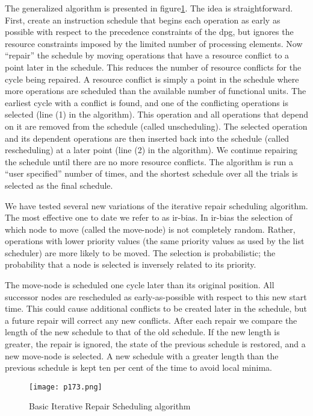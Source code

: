 The generalized algorithm is presented in figure\ref{fig:p173}. The idea is straightforward. First, create an instruction
schedule that begins each operation as early as possible with respect to the precedence constraints of the dpg,
but ignores the resource constraints imposed by the limited number of processing elements. Now “repair” the
schedule by moving operations that have a resource conflict to a point later in the schedule. This reduces the
number of resource conflicts for the cycle being repaired. A resource conflict is simply a point in the schedule
where more operations are scheduled than the available number of functional units. The earliest cycle with a
conflict is found, and one of the conflicting operations is selected (line (1) in the algorithm). This operation
and all operations that depend on it are removed from the schedule (called unscheduling). The selected
operation and its dependent operations are then inserted back into the schedule (called rescheduling) at a
later point (line (2) in the algorithm). We continue repairing the schedule until there are no more resource
conflicts. The algorithm is run a “user specified” number of times, and the shortest schedule over all the
trials is selected as the final schedule.

We have tested several new variations of the iterative repair scheduling algorithm. The most effective
one to date we refer to as ir-bias. In ir-bias the selection of which node to move (called the move-node) is
not completely random. Rather, operations with lower priority values (the same priority values as used by
the list scheduler) are more likely to be moved. The selection is probabilistic; the probability that a node is
selected is inversely related to its priority.

The move-node is scheduled one cycle later than its original position. All successor nodes are rescheduled
as early-as-possible with respect to this new start time. This could cause additional conflicts to be created
later in the schedule, but a future repair will correct any new conflicts. After each repair we compare the
length of the new schedule to that of the old schedule. If the new length is greater, the repair is ignored,
the state of the previous schedule is restored, and a new move-node is selected. A new schedule with a
greater length than the previous schedule is kept ten per cent of the time to avoid local minima. 
\begin{figure}[H]
	\centering
	\texttt{[image: p173.png]}
	\caption{Basic Iterative Repair Scheduling algorithm}
	\label{fig:p173}
\end{figure}
